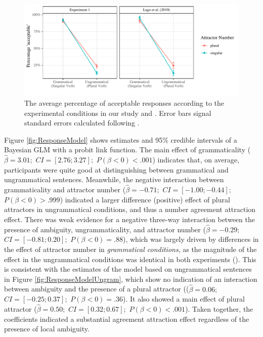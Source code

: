 \documentclass[]{interact}\usepackage[]{graphicx}\usepackage[]{color}
\newenvironment{knitrout}{}{} %
\theoremstyle{plain}%
\theoremstyle{definition}
\theoremstyle{remark}
\begin{document}
\begin{knitrout}
\color{fgcolor}\begin{figure}[hbt!]

{\centering \includegraphics[width=\linewidth]{figure/AverageResponses-1} 

}

\caption{The average percentage of acceptable responses according to the experimental conditions in our study and \citet{LagoEtAl:2019}. Error bars signal standard errors calculated following \citet{Morey:2008,Cousineau:2005}.}\label{fig:AverageResponses}
\end{figure}

\end{knitrout}


Figure \ref{fig:ResponseModel} shows estimates and 95\% credible intervals of a Bayesian GLM with a probit link function. The main effect of grammaticality ($\hat{\beta}=3.01;$ $CI=[2.76; 3.27];$ $P(\beta<0)< .001$) indicates that, on average, participants were quite good at distinguishing between grammatical and ungrammatical sentences. Meanwhile, the negative interaction between grammaticality and attractor number ($\hat{\beta}=-0.71;$ $CI=[-1.00; -0.44];$ $P(\beta<0)> .999$) indicated a larger difference (positive) effect of plural attractors in ungrammatical conditions, and thus a number agreement attraction effect. There was weak evidence for a negative three-way interaction between the presence of ambiguity, ungrammaticality, and attractor number ($\hat{\beta}=-0.29;$ $CI=[-0.81; 0.20];$ $P(\beta<0)=    .88$), which was largely driven by differences in the effect of attractor number in \textit{grammatical conditions}, as the magnitude of the effect in the ungrammatical conditions was identical in both experiments ().  
This is consistent with the estimates of the model based on ungrammatical sentences in Figure \ref{fig:ResponseModelUngram}, which show no indication of an interaction between ambiguity and the presence of a plural attractor (($\hat{\beta}=0.06;$ $CI=[-0.25; 0.37];$ $P(\beta<0)=    .36$). It also showed a main effect of plural attractor ($\hat{\beta}=0.50;$ $CI=[0.32; 0.67];$ $P(\beta<0)< .001$). Taken together, the coefficients indicated a substantial agreement attraction effect regardless of the presence of local ambiguity.  
\end{document}
